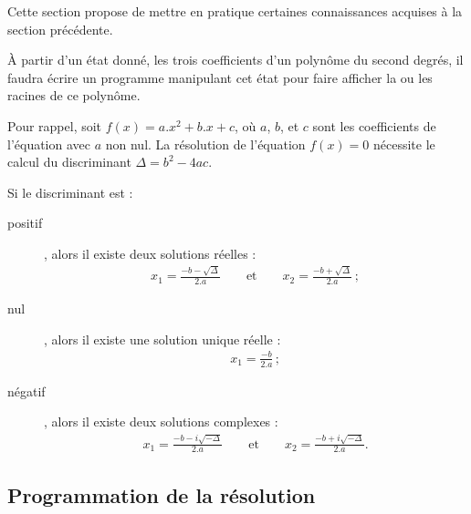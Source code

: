 
Cette section propose de mettre en pratique certaines
connaissances acquises à la section précédente.

À partir d'un état donné, les trois coefficients d'un polynôme
du second degrés, il faudra écrire un programme manipulant
cet état pour faire afficher la ou les racines de ce
polynôme.

Pour rappel, soit  $f(x) = a.x^2+b.x+c$, où $a$, $b$, et $c$ sont les 
 coefficients   de  l'équation  avec  $a$
 non nul. La résolution de l'équation $f(x) = 0$
 nécessite le calcul du
 discriminant $\Delta =  b^2-4ac$.

 Si  le 
discriminant est :
\begin{description}
\item[positif], alors il existe deux solutions réelles :
\begin{eqnarray*}
  x_1   =  \frac{-b-\sqrt{\Delta}}{2.a}   \qquad  \textrm{et}   \qquad
  x_2=\frac{-b+\sqrt{\Delta}}{2.a}\,;
\end{eqnarray*}
\item[nul], alors il existe une solution unique réelle :
\begin{eqnarray*}
  x_1 = \frac{-b}{2.a}\,;
\end{eqnarray*}
\item[négatif], alors il existe deux solutions complexes :
\begin{eqnarray*}
  x_1  =   \frac{-b-i\sqrt{-\Delta}}{2.a}  \qquad   \textrm{et}  \qquad
  x_2=\frac{-b+i\sqrt{-\Delta}}{2.a}.
\end{eqnarray*}
\end{description}

\subsection{Programmation de la résolution}



